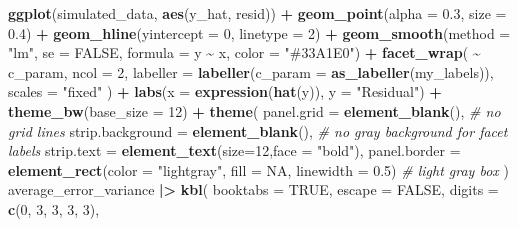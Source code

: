 \documentclass[
  twocolumn]{article}
\newenvironment{Shaded}{\begin{snugshade}}{\end{snugshade}}
\newcommand{\AttributeTok}[1]{\textcolor[rgb]{0.13,0.29,0.53}{#1}}
\newcommand{\CommentTok}[1]{\textcolor[rgb]{0.56,0.35,0.01}{\textit{#1}}}
\newcommand{\ConstantTok}[1]{\textcolor[rgb]{0.56,0.35,0.01}{#1}}
\newcommand{\DecValTok}[1]{\textcolor[rgb]{0.00,0.00,0.81}{#1}}
\newcommand{\FloatTok}[1]{\textcolor[rgb]{0.00,0.00,0.81}{#1}}
\newcommand{\FunctionTok}[1]{\textcolor[rgb]{0.13,0.29,0.53}{\textbf{#1}}}
\newcommand{\NormalTok}[1]{#1}
\newcommand{\SpecialCharTok}[1]{\textcolor[rgb]{0.81,0.36,0.00}{\textbf{#1}}}
\newcommand{\StringTok}[1]{\textcolor[rgb]{0.31,0.60,0.02}{#1}}
\begin{document}
\begin{Shaded}
\begin{Highlighting}[]
\FunctionTok{ggplot}\NormalTok{(simulated\_data, }\FunctionTok{aes}\NormalTok{(y\_hat, resid)) }\SpecialCharTok{+}
  \FunctionTok{geom\_point}\NormalTok{(}\AttributeTok{alpha =} \FloatTok{0.3}\NormalTok{, }\AttributeTok{size =} \FloatTok{0.4}\NormalTok{) }\SpecialCharTok{+}
  \FunctionTok{geom\_hline}\NormalTok{(}\AttributeTok{yintercept =} \DecValTok{0}\NormalTok{, }\AttributeTok{linetype =} \DecValTok{2}\NormalTok{) }\SpecialCharTok{+}
  \FunctionTok{geom\_smooth}\NormalTok{(}\AttributeTok{method =} \StringTok{"lm"}\NormalTok{, }\AttributeTok{se =} \ConstantTok{FALSE}\NormalTok{, }\AttributeTok{formula =}\NormalTok{ y }\SpecialCharTok{\textasciitilde{}}\NormalTok{ x, }\AttributeTok{color =} \StringTok{"\#33A1E0"}\NormalTok{) }\SpecialCharTok{+}
  \FunctionTok{facet\_wrap}\NormalTok{(}
    \SpecialCharTok{\textasciitilde{}}\NormalTok{ c\_param,}
    \AttributeTok{ncol =} \DecValTok{2}\NormalTok{,}
    \AttributeTok{labeller =} \FunctionTok{labeller}\NormalTok{(}\AttributeTok{c\_param =} \FunctionTok{as\_labeller}\NormalTok{(my\_labels)),  }
    \AttributeTok{scales =} \StringTok{"fixed"}
\NormalTok{  ) }\SpecialCharTok{+}
  \FunctionTok{labs}\NormalTok{(}\AttributeTok{x =} \FunctionTok{expression}\NormalTok{(}\FunctionTok{hat}\NormalTok{(y)), }\AttributeTok{y =} \StringTok{"Residual"}\NormalTok{) }\SpecialCharTok{+}   
  \FunctionTok{theme\_bw}\NormalTok{(}\AttributeTok{base\_size =} \DecValTok{12}\NormalTok{) }\SpecialCharTok{+}
  \FunctionTok{theme}\NormalTok{(}
    \AttributeTok{panel.grid =} \FunctionTok{element\_blank}\NormalTok{(),            }\CommentTok{\# no grid lines}
    \AttributeTok{strip.background =} \FunctionTok{element\_blank}\NormalTok{(),      }\CommentTok{\# no gray background for facet labels}
    \AttributeTok{strip.text =} \FunctionTok{element\_text}\NormalTok{(}\AttributeTok{size=}\DecValTok{12}\NormalTok{,}\AttributeTok{face =} \StringTok{"bold"}\NormalTok{),}
    \AttributeTok{panel.border =} \FunctionTok{element\_rect}\NormalTok{(}\AttributeTok{color =} \StringTok{"lightgray"}\NormalTok{, }\AttributeTok{fill =} \ConstantTok{NA}\NormalTok{, }\AttributeTok{linewidth =} \FloatTok{0.5}\NormalTok{) }\CommentTok{\# light gray box}
\NormalTok{  )}
\NormalTok{average\_error\_variance }\SpecialCharTok{|\textgreater{}}
  \FunctionTok{kbl}\NormalTok{(}
    \AttributeTok{booktabs =} \ConstantTok{TRUE}\NormalTok{,}
    \AttributeTok{escape   =} \ConstantTok{FALSE}\NormalTok{,}
    \AttributeTok{digits   =} \FunctionTok{c}\NormalTok{(}\DecValTok{0}\NormalTok{, }\DecValTok{3}\NormalTok{, }\DecValTok{3}\NormalTok{, }\DecValTok{3}\NormalTok{, }\DecValTok{3}\NormalTok{),}

\end{Highlighting}
\end{Shaded}
\end{document}
